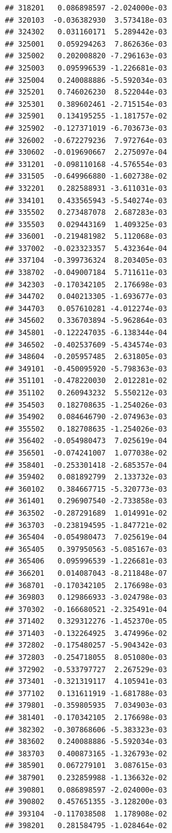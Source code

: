 \begin{frame}[fragile]
\begin{verbatim}
## 318201   0.086898597 -2.024000e-03
## 320103  -0.036382930  3.573418e-03
## 324302   0.031160171  5.289442e-03
## 325001   0.059294263  7.862636e-03
## 325002   0.202008820 -7.296163e-03
## 325003   0.095996539 -1.226681e-03
## 325004   0.240088886 -5.592034e-03
## 325201   0.746026230  8.522044e-03
## 325301   0.389602461 -2.715154e-03
## 325901   0.134195255 -1.181757e-02
## 325902  -0.127371019 -6.703673e-03
## 326002  -0.672279236  7.972764e-03
## 330602  -0.019690667  2.275097e-04
## 331201  -0.098110168 -4.576554e-03
## 331505  -0.649966880 -1.602738e-02
## 332201   0.282588931 -3.611031e-03
## 334101   0.433565943 -5.540274e-03
## 335502   0.273487078  2.687283e-03
## 335503   0.029443169  1.409325e-03
## 336001  -0.219481982  5.112068e-03
## 337002  -0.023323357  5.432364e-04
## 337104  -0.399736324  8.203405e-03
## 338702  -0.049007184  5.711611e-03
## 342303  -0.170342105  2.176698e-03
## 344702   0.040213305 -1.693677e-03
## 344703   0.057610281 -4.012274e-03
## 345602   0.336703894 -5.962864e-03
## 345801  -0.122247035 -6.138344e-04
## 346502  -0.402537609 -5.434574e-03
## 348604  -0.205957485  2.631805e-03
## 349101  -0.450095920 -5.798363e-03
## 351101  -0.478220030  2.012281e-02
## 351102   0.260943232  5.550212e-03
## 354503   0.182708635 -1.254026e-03
## 354902   0.084646790 -2.074963e-03
## 355502   0.182708635 -1.254026e-03
## 356402  -0.054980473  7.025619e-04
## 356501  -0.074241007  1.077038e-02
## 358401  -0.253301418 -2.685357e-04
## 359402   0.081892799  2.133732e-03
## 360102   0.384667715 -5.320773e-03
## 361401   0.296907540 -2.733858e-03
## 363502  -0.287291689  1.014991e-02
## 363703  -0.238194595 -1.847721e-02
## 365404  -0.054980473  7.025619e-04
## 365405   0.397950563 -5.085167e-03
## 365406   0.095996539 -1.226681e-03
## 366201   0.014087043 -8.211848e-07
## 368701  -0.170342105  2.176698e-03
## 369803   0.129866933 -3.024798e-03
## 370302  -0.166680521 -2.325491e-04
## 371402   0.329312276 -1.452370e-05
## 371403  -0.132264925  3.474996e-02
## 372802  -0.175480257 -5.904342e-03
## 372803  -0.254718055  8.051080e-03
## 372902  -0.533797727  2.267529e-03
## 373401  -0.321319117  4.105941e-03
## 377102   0.131611919 -1.681788e-03
## 379801  -0.359805935  7.034903e-03
## 381401  -0.170342105  2.176698e-03
## 382302  -0.307868606 -5.383323e-03
## 383602   0.240088886 -5.592034e-03
## 383703   0.400873165 -1.326793e-02
## 385901   0.067279101  3.087615e-03
## 387901   0.232859988 -1.136632e-02
## 390801   0.086898597 -2.024000e-03
## 390802   0.457651355 -3.128200e-03
## 393104  -0.117038508  1.178908e-02
## 398201   0.281584795 -1.028464e-02

\end{verbatim}
\end{frame}
